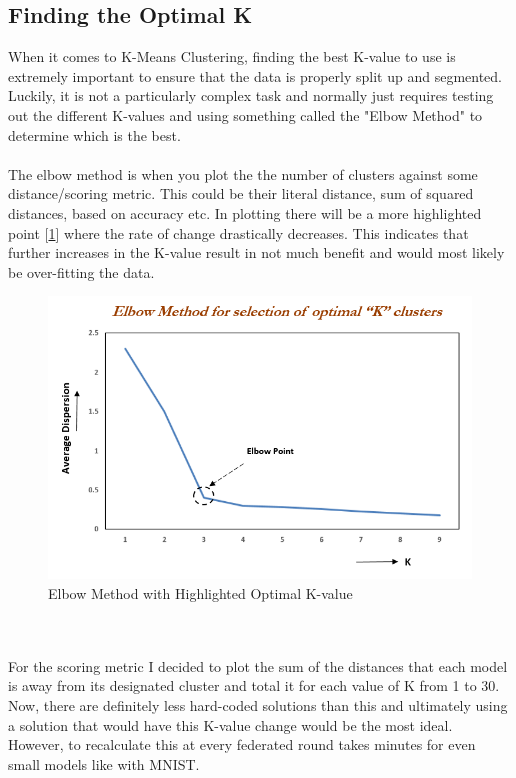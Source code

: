 \subsection{Finding the Optimal K}
When it comes to K-Means Clustering, finding the best K-value to use is extremely important to ensure that the data is properly split up and segmented.
Luckily, it is not a particularly complex task and normally just requires testing out the different K-values and using something called the "Elbow Method" to determine which is the best.
\\ \\
The elbow method is when you plot the the number of clusters against some distance/scoring metric.
This could be their literal distance, sum of squared distances, based on accuracy etc.
In plotting there will be a more highlighted point [\ref{fig:elbow}] where the rate of change drastically decreases.
This indicates that further increases in the K-value result in not much benefit and would most likely be over-fitting the data.
\begin{figure}[htbp]
	\centering
    \includegraphics[scale=0.5]{my_agg/graphs/elbow.png}
	\caption{Elbow Method with Highlighted Optimal K-value \cite{oreily_elbow}}
	\label{fig:elbow}
\end{figure}
\\ \\
For the scoring metric I decided to plot the sum of the distances that each model is away from its designated cluster and total it for each value of K from 1 to 30.
Now, there are definitely less hard-coded solutions than this and ultimately using a solution that would have this K-value change would be the most ideal.
However, to recalculate this at every federated round takes minutes for even small models like with MNIST.
